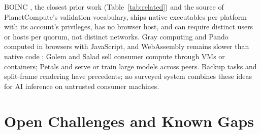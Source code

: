 \documentclass[11pt,a4paper]{article}
\theoremstyle{definition}
\theoremstyle{plain}
\begin{document}
BOINC \citep{anderson2004boinc,anderson2020boinc}, the closest prior work (Table~\ref{tab:related}) and the source
of PlanetCompute's validation vocabulary, ships native executables per platform with its account's privileges, has no
browser host, and can require distinct users or hosts per quorum, not distinct networks. Gray computing
\citep{pan2015gray} and Pando \citep{lavoie2019pando} computed in browsers with JavaScript, and WebAssembly
remains slower than native code \citep{jangda2019notsofast}; Golem \citep{golem2016} and Salad \citep{salad} sell
consumer compute through VMs or containers; Petals \citep{borzunov2023petals} and
\citet{ryabinin2020moe} serve or train large models across peers. Backup tasks \citep{dean2004mapreduce} and split-frame
rendering have precedents; no surveyed system combines these ideas for AI inference on untrusted consumer machines.

\section{Open Challenges and Known Gaps}\label{sec:gaps}
\end{document}
